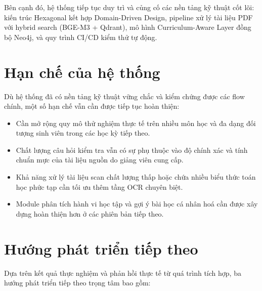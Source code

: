 Bên cạnh đó, hệ thống tiếp tục duy trì và củng cố các nền tảng kỹ thuật cốt lõi:
kiến trúc Hexagonal kết hợp Domain-Driven Design, pipeline xử lý tài liệu PDF
với hybrid search (BGE-M3 + Qdrant), mô hình Curriculum-Aware Layer đồng bộ
Neo4j, và quy trình CI/CD kiểm thử tự động.

\section{Hạn chế của hệ thống}

Dù hệ thống đã có nền tảng kỹ thuật vững chắc và kiểm chứng được các flow chính,
một số hạn chế vẫn cần được tiếp tục hoàn thiện:
\begin{itemize}
    \item Cần mở rộng quy mô thử nghiệm thực tế trên nhiều môn học và đa dạng
          đối tượng sinh viên trong các học kỳ tiếp theo.
    \item Chất lượng câu hỏi kiểm tra vẫn có sự phụ thuộc vào độ chính xác và tính
          chuẩn mực của tài liệu nguồn do giảng viên cung cấp.
    \item Khả năng xử lý tài liệu scan chất lượng thấp hoặc chứa nhiều biểu thức
          toán học phức tạp cần tối ưu thêm tầng OCR chuyên biệt.
    \item Module phân tích hành vi học tập và gợi ý bài học cá nhân hoá cần
          được xây dựng hoàn thiện hơn ở các phiên bản tiếp theo.
\end{itemize}

\section{Hướng phát triển tiếp theo}
\label{sec:future-work}

Dựa trên kết quả thực nghiệm và phản hồi thực tế từ quá trình tích hợp, ba hướng
phát triển tiếp theo trọng tâm bao gồm:

